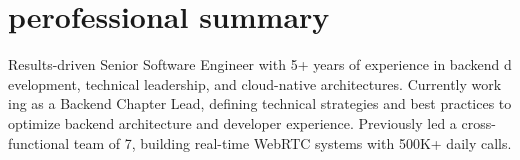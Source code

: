 \documentclass[a4paper]{article}
\begin{document}
\begin{minipage}[t]{0.65\textwidth}
  \preparetopsec
  \section{perofessional summary}
    \begin{justify}
      \begin{footnotesize}
Results-driven Senior Software Engineer with 5+ years of experience in backend d
evelopment, technical leadership, and cloud-native architectures. Currently work
ing as a Backend Chapter Lead, defining technical strategies and best practices 
to optimize backend architecture and developer experience. Previously led a cross-functional 
team of 7, building real-time WebRTC systems with 500K+ daily calls.
      \end{footnotesize}
    \end{justify}
  \preparenormalsec

\end{minipage}
\end{document}

